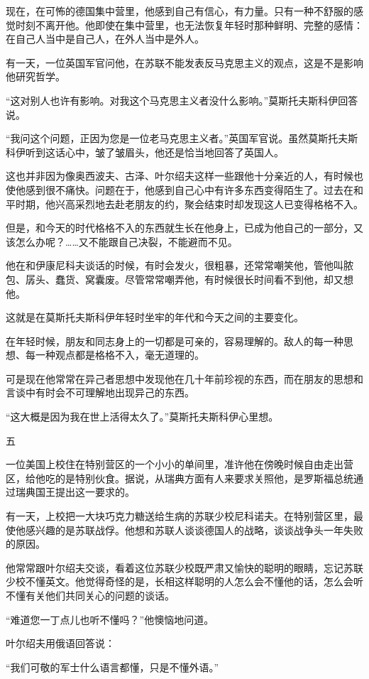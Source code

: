 现在，在可怖的德国集中营里，他感到自己有信心，有力量。只有一种不舒服的感觉时刻不离开他。他即使在集中营里，也无法恢复年轻时那种鲜明、完整的感情：在自己人当中是自己人，在外人当中是外人。

有一天，一位英国军官问他，在苏联不能发表反马克思主义的观点，这是不是影响他研究哲学。

“这对别人也许有影响。对我这个马克思主义者没什么影响。”莫斯托夫斯科伊回答说。

“我问这个问题，正因为您是一位老马克思主义者。”英国军官说。虽然莫斯托夫斯科伊听到这话心中，皱了皱眉头，他还是恰当地回答了英国人。

这也并非因为像奥西波夫、古泽、叶尔绍夫这样一些跟他十分亲近的人，有时候也使他感到很不痛快。问题在于，他感到自己心中有许多东西变得陌生了。过去在和平时期，他兴高采烈地去赴老朋友的约，聚会结束时却发现这人已变得格格不入。

但是，和今天的时代格格不入的东西就生长在他身上，已成为他自己的一部分，又该怎么办呢？……又不能跟自己决裂，不能避而不见。

他在和伊康尼科夫谈话的时候，有时会发火，很粗暴，还常常嘲笑他，管他叫脓包、孱头、蠢货、窝囊废。尽管常常嘲弄他，有时候很长时间看不到他，却又想他。

这就是在莫斯托夫斯科伊年轻时坐牢的年代和今天之间的主要变化。

在年轻时候，朋友和同志身上的一切都是可亲的，容易理解的。敌人的每一种思想、每一种观点都是格格不入，毫无道理的。

可是现在他常常在异己者思想中发现他在几十年前珍视的东西，而在朋友的思想和言谈中有时会不可理解地出现异己的东西。

“这大概是因为我在世上活得太久了。”莫斯托夫斯科伊心里想。

五

一位美国上校住在特别营区的一个小小的单间里，准许他在傍晚时候自由走出营区，给他吃的是特别伙食。据说，从瑞典方面有人来要求关照他，是罗斯福总统通过瑞典国王提出这一要求的。

有一天，上校把一大块巧克力糖送给生病的苏联少校尼科诺夫。在特别营区里，最使他感兴趣的是苏联战俘。他想和苏联人谈谈德国人的战略，谈谈战争头一年失败的原因。

他常常跟叶尔绍夫交谈，看着这位苏联少校既严肃又愉快的聪明的眼睛，忘记苏联少校不懂英文。他觉得奇怪的是，长相这样聪明的人怎么会不懂他的话，怎么会听不懂有关他们共同关心的问题的谈话。

“难道您一丁点儿也听不懂吗？”他懊恼地问道。

叶尔绍夫用俄语回答说：

“我们可敬的军士什么语言都懂，只是不懂外语。”

